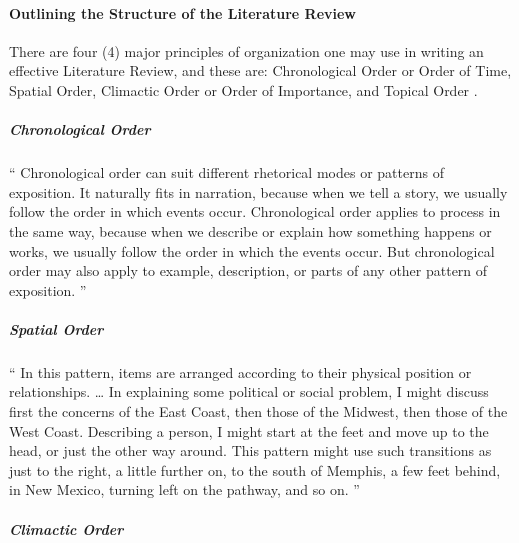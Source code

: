 \documentclass{strrespaper-trad}
\begin{document}
		\paragraph{Outlining the Structure of the Literature Review}
			There are four (4) major principles of organization one may use in writing an effective Literature Review, and these are: Chronological Order or Order of Time, Spatial Order, Climactic Order or Order of Importance, and Topical Order \autocite{friedlanderPrinciplesOrganization2004}.
			\subparagraph{Chronological Order}
				\enquote{%
					Chronological order can suit different rhetorical modes or patterns of exposition.
					It naturally fits in narration, because when we tell a story, we usually follow the order in which events occur.
					Chronological order applies to process in the same way, because when we describe or explain how something happens or works, we usually follow the order in which the events occur.
					But chronological order may also apply to example, description, or parts of any other pattern of exposition.%
				} \autocite{friedlanderPrinciplesOrganization2004}
			\subparagraph{Spatial Order}
				\enquote{%
					In this pattern, items are arranged according to their physical position or relationships.
					\dots
					In explaining some political or social problem, I might discuss first the concerns of the East Coast, then those of the Midwest, then those of the West Coast.
					Describing a person, I might start at the feet and move up to the head, or just the other way around.
					This pattern might use such transitions as just to the right, a little further on, to the south of Memphis, a few feet behind, in New Mexico, turning left on the pathway, and so on.%
				} \autocite{friedlanderPrinciplesOrganization2004}
			\subparagraph{Climactic Order}
\end{document}
